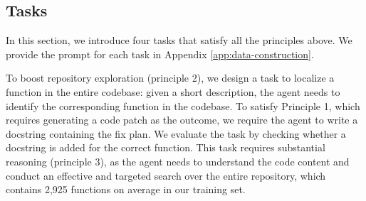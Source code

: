 \documentclass{article}
\theoremstyle{plain}
\theoremstyle{definition}
\theoremstyle{remark}
\begin{document}
\begin{table}[t]
\centering
\vspace{-0.15cm}
\caption{Performance of the student and teacher models on a subset of instances sampled from each training task.}
\vspace{-0.5cm}
\label{tab:distillation-sanity-check}
\end{table}


\subsection{\methodName Tasks}
\label{sec:tasks}

In this section, we introduce four \methodName tasks that satisfy all the principles above. We provide the prompt for each task in Appendix \ref{app:data-construction}.

To boost repository exploration (principle 2), we design a task to localize a function in the entire codebase:
given a short description, the agent needs to identify the corresponding function in the codebase.
To satisfy Principle 1, which requires generating a code patch as the outcome, we require the agent to write a docstring containing the fix plan. 
We evaluate the task by checking whether a docstring is added for the correct function.
This task requires substantial reasoning (principle 3), as the agent needs to understand the code content and conduct an effective and targeted search over the entire repository, which contains 2,925 functions on average in our training set.
\end{document}

